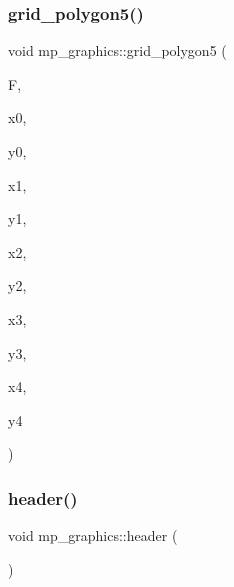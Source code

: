 \subsubsection{\texorpdfstring{grid\+\_\+polygon5()}{grid\_polygon5()}}
{\footnotesize\ttfamily void mp\+\_\+graphics\+::grid\+\_\+polygon5 (\begin{DoxyParamCaption}\item[{\mbox{\hyperlink{structgrid__frame}{grid\+\_\+frame}} $\ast$}]{F,  }\item[{\mbox{\hyperlink{galois_8h_a09fddde158a3a20bd2dcadb609de11dc}{I\+NT}}}]{x0,  }\item[{\mbox{\hyperlink{galois_8h_a09fddde158a3a20bd2dcadb609de11dc}{I\+NT}}}]{y0,  }\item[{\mbox{\hyperlink{galois_8h_a09fddde158a3a20bd2dcadb609de11dc}{I\+NT}}}]{x1,  }\item[{\mbox{\hyperlink{galois_8h_a09fddde158a3a20bd2dcadb609de11dc}{I\+NT}}}]{y1,  }\item[{\mbox{\hyperlink{galois_8h_a09fddde158a3a20bd2dcadb609de11dc}{I\+NT}}}]{x2,  }\item[{\mbox{\hyperlink{galois_8h_a09fddde158a3a20bd2dcadb609de11dc}{I\+NT}}}]{y2,  }\item[{\mbox{\hyperlink{galois_8h_a09fddde158a3a20bd2dcadb609de11dc}{I\+NT}}}]{x3,  }\item[{\mbox{\hyperlink{galois_8h_a09fddde158a3a20bd2dcadb609de11dc}{I\+NT}}}]{y3,  }\item[{\mbox{\hyperlink{galois_8h_a09fddde158a3a20bd2dcadb609de11dc}{I\+NT}}}]{x4,  }\item[{\mbox{\hyperlink{galois_8h_a09fddde158a3a20bd2dcadb609de11dc}{I\+NT}}}]{y4 }\end{DoxyParamCaption})}

\mbox{\label{classmp__graphics_ad500b1cac8c75bf8a2f2ac78938c4e30}} 
\subsubsection{\texorpdfstring{header()}{header()}}
{\footnotesize\ttfamily void mp\+\_\+graphics\+::header (\begin{DoxyParamCaption}{ }\end{DoxyParamCaption})}

\mbox{\label{classmp__graphics_a001ad397d28bb3032a3201aac0896ce8}} 
